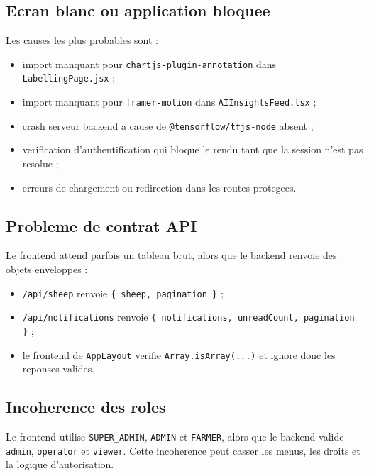\documentclass[11pt,a4paper]{article}
\begin{document}
\subsection{Ecran blanc ou application bloquee}
Les causes les plus probables sont :
\begin{itemize}[leftmargin=1.2cm]
  \item import manquant pour \texttt{chartjs-plugin-annotation} dans \texttt{LabellingPage.jsx} ;
  \item import manquant pour \texttt{framer-motion} dans \texttt{AIInsightsFeed.tsx} ;
  \item crash serveur backend a cause de \texttt{@tensorflow/tfjs-node} absent ;
  \item verification d'authentification qui bloque le rendu tant que la session n'est pas resolue ;
  \item erreurs de chargement ou redirection dans les routes protegees.
\end{itemize}

\subsection{Probleme de contrat API}
Le frontend attend parfois un tableau brut, alors que le backend renvoie des objets enveloppes :
\begin{itemize}[leftmargin=1.2cm]
  \item \texttt{/api/sheep} renvoie \texttt{\{ sheep, pagination \}} ;
  \item \texttt{/api/notifications} renvoie \texttt{\{ notifications, unreadCount, pagination \}} ;
  \item le frontend de \texttt{AppLayout} verifie \texttt{Array.isArray(...)} et ignore donc les reponses valides.
\end{itemize}

\subsection{Incoherence des roles}
Le frontend utilise \texttt{SUPER\_ADMIN}, \texttt{ADMIN} et \texttt{FARMER}, alors que le backend valide \texttt{admin}, \texttt{operator} et \texttt{viewer}. Cette incoherence peut casser les menus, les droits et la logique d'autorisation.
\end{document}
